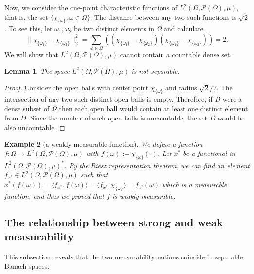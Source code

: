 \documentclass[a4paper, 12pt]{article}
\newtheorem{lem}{Lemma}[section]
\newtheorem{example}[lem]{Example}
\begin{document}
Now, we consider the one-point characteristic functions of $L^2(\Omega, \mathcal{P}(\Omega), \mu)$, that is, the set $\lbrace \chi_{\lbrace \omega \rbrace} : \omega \in \Omega \rbrace$. The distance between any two such functions is $\sqrt{2}$. To see this, let $\omega_1, \omega_2$ be two distinct elements in $\Omega$ and calculate 
$$
\| \chi_{\lbrace \omega_1 \rbrace} - \chi_{\lbrace \omega_2 \rbrace} \|^2_2 = \sum_{\omega \in \Omega}\left( (\chi_{\lbrace \omega_1 \rbrace} - \chi_{\lbrace \omega_2 \rbrace})(\chi_{\lbrace \omega_1 \rbrace} - \chi_{\lbrace \omega_2 \rbrace}) \right) = 2.
$$
We will show that $L^2(\Omega, \mathcal{P}(\Omega), \mu)$ cannot contain a countable dense set.
\begin{lem}\label{all:nonseparable-hilbert-space} The space $L^2(\Omega, \mathcal{P}(\Omega), \mu)$ is not separable.
\end{lem}
\begin{proof}
Consider the open balls with center point $\chi_{\lbrace \omega \rbrace}$ and radius $\sqrt{2}/2$. The intersection of any two such distinct open balls is empty. Therefore, if $D$ were a dense subset of $\Omega$ then each open ball would contain at least one distinct element from $D$. Since the number of such open balls is uncountable, the set $D$ would be also uncountable.
\end{proof}
\begin{example}[a weakly measurable function] \label{all:weakly-lebesgue-m-function}\normalfont
We define a function $f \colon \Omega \rightarrow L^2(\Omega, \mathcal{P}(\Omega), \mu)$ with $f(\omega) := \chi_{\lbrace \omega \rbrace}(\cdot)$. Let $x^*$ be a functional in $L^2(\Omega, \mathcal{P}(\Omega), \mu)^*$. By the Riesz representation theorem, we can find an element $f_{x^*} \in L^2(\Omega, \mathcal{P}(\Omega), \mu)$ such that 
$x^*(f(\omega)) = \langle f_{x^*}, f(\omega) \rangle = \langle f_{x^*}, \chi_{\lbrace \omega \rbrace} \rangle = f_{x^*}(\omega)$ which is a measurable function, and thus we proved that $f$ is weakly measurable.
\end{example}
\subsection{The relationship between strong and weak measurability} This subsection reveals that the two measurability notions coincide in separable Banach spaces.
\end{document}

